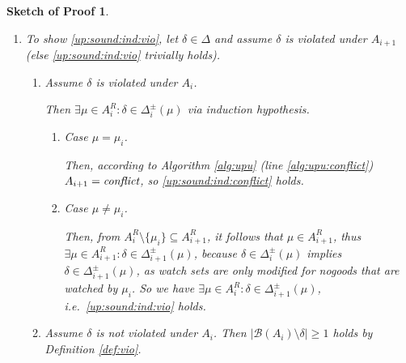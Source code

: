 \documentclass[final]{vutinfth} %
\newtheorem{proof-sketch}{Sketch of Proof}[chapter]
\newcommand{\bass}{\mathcal{B}}
\newcommand{\ass}{A}
\newcommand{\bT}{\mathbf{T}}
\newcommand{\bF}{\mathbf{F}}
\newcommand{\dpm}{\Delta^\pm}
\newcommand{\headf}{H}
\newcommand{\bodyf}{B}
\newcommand{\sgl}{\mu}
\newcommand{\bsgl}{\sigma}
\begin{document}
\begin{proof-sketch}
\begin{enumerate}
\begin{enumerate}
\begin{enumerate}
	\end{enumerate}
\end{enumerate}

\item To show \ref{up:sound:ind:vio}, let $\delta \in \Delta$ and assume $\delta$ is violated under $A_{i+1}$ (else \ref{up:sound:ind:vio} trivially holds).
\begin{enumerate}
\item Assume $\delta$ is violated under $A_i$.

Then $\exists \sgl \in \ass_i^R : \delta \in \dpm_i(\sgl)$ via induction hypothesis.
\begin{enumerate}
\item Case $\sgl = \sgl_i$.

Then, according to Algorithm \ref{alg:upu} (line \ref{alg:upu:conflict}) $A_{i+1} = \emph{conflict}$, so \ref{up:sound:ind:conflict} holds.

\item Case $\sgl \not = \sgl_i$.

Then, from $\ass_{i}^R \setminus \{ \sgl_i \} \subseteq \ass_{i+1}^R$, it follows that $\sgl \in \ass_{i+1}^R$, thus $\exists \sgl \in \ass_{i+1}^R : \delta \in \dpm_{i+1}(\sgl)$, because $\delta \in \dpm_i(\sgl)$ implies $\delta \in \dpm_{i+1}(\sgl)$, as watch sets are only modified for nogoods that are watched by $\sgl_i$. So we have $\exists \sgl \in \ass_i^R : \delta \in \dpm_{i+1}(\sgl)$, i.e.~\ref{up:sound:ind:vio} holds.
\end{enumerate}
\item Assume $\delta$ is not violated under $A_i$. Then $|\bass(A_i) \setminus \delta| \geq 1$  holds by Definition \ref{def:vio}.


\end{enumerate}
\end{enumerate}
\end{proof-sketch}
\end{document}
